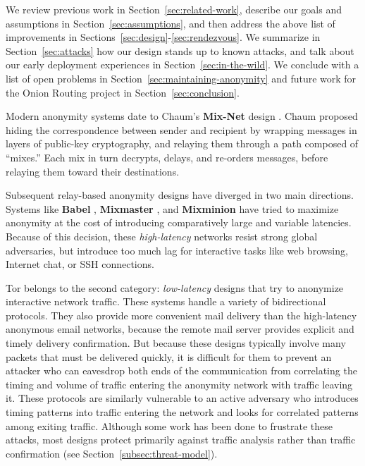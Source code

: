 \documentclass[times,10pt,twocolumn]{article}
\begin{document}
We review previous work in Section~\ref{sec:related-work}, describe
our goals and assumptions in Section~\ref{sec:assumptions},
and then address the above list of improvements in
Sections~\ref{sec:design}-\ref{sec:rendezvous}. We summarize
in Section~\ref{sec:attacks} how our design stands up to
known attacks, and talk about our early deployment experiences in
Section~\ref{sec:in-the-wild}. We conclude with a list of open problems in
Section~\ref{sec:maintaining-anonymity} and future work for the Onion
Routing project in Section~\ref{sec:conclusion}.


\label{sec:related-work}

Modern anonymity systems date to Chaum's {\bf Mix-Net} design
\cite{chaum-mix}. Chaum
proposed hiding the correspondence between sender and recipient by
wrapping messages in layers of public-key cryptography, and relaying them
through a path composed of ``mixes.''  Each mix in turn
decrypts, delays, and re-orders messages, before relaying them toward
their destinations.

Subsequent relay-based anonymity designs have diverged in two
main directions. Systems like {\bf Babel} \cite{babel}, {\bf Mixmaster}
\cite{mixmaster-spec}, and {\bf Mixminion} \cite{minion-design} have tried
to maximize anonymity at the cost of introducing comparatively large and
variable latencies. Because of this decision, these \emph{high-latency}
networks resist strong global adversaries,
but introduce too much lag for interactive tasks like web browsing,
Internet chat, or SSH connections.

Tor belongs to the second category: \emph{low-latency} designs that
try to anonymize interactive network traffic. These systems handle
a variety of bidirectional protocols. They also provide more convenient
mail delivery than the high-latency anonymous email
networks, because the remote mail server provides explicit and timely
delivery confirmation. But because these designs typically
involve many packets that must be delivered quickly, it is
difficult for them to prevent an attacker who can eavesdrop both ends of the
communication from correlating the timing and volume
of traffic entering the anonymity network with traffic leaving it.  These
protocols are similarly vulnerable to an active adversary who introduces
timing patterns into traffic entering the network and looks
for correlated patterns among exiting traffic.
Although some work has been done to frustrate
these attacks, %
 most designs protect primarily against traffic analysis rather than traffic
confirmation (see Section~\ref{subsec:threat-model}).
\end{document}

